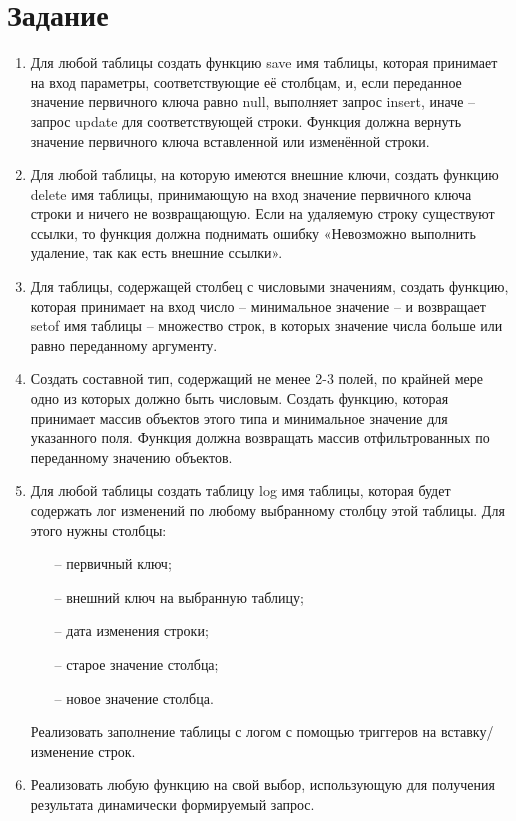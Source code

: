 \documentclass[a4paper,14pt]{extarticle}
\begin{document}
  \section*{Задание}
  \begin{enumerate}
    \item Для любой таблицы создать функцию save имя таблицы, которая принимает на вход параметры, соответствующие её столбцам, и, если переданное значение первичного ключа равно null, выполняет запрос insert, иначе – запрос update для соответствующей строки. Функция должна вернуть значение первичного ключа вставленной или изменённой строки.
    \item Для любой таблицы, на которую имеются внешние ключи, создать функцию delete имя таблицы, принимающую на вход значение первичного ключа строки и ничего не возвращающую. Если на удаляемую строку существуют ссылки, то функция должна поднимать ошибку «Невозможно выполнить удаление, так как есть внешние ссылки».
    \item  Для таблицы, содержащей столбец с числовыми значениям, создать функцию, которая принимает на вход число – минимальное значение – и возвращает setof имя таблицы – множество строк, в которых значение числа больше или равно переданному аргументу. 
    \item Создать составной тип, содержащий не менее 2-3 полей, по крайней мере одно из которых должно быть числовым. Создать функцию, которая принимает массив объектов этого типа и минимальное значение для указанного поля. Функция должна возвращать массив отфильтрованных по переданному значению объектов.
    \item  Для любой таблицы создать таблицу log имя таблицы, которая будет содержать лог изменений по любому выбранному столбцу этой таблицы. Для этого нужны столбцы:
      \begin{itemize}
        \item[--] первичный ключ;
        \item[--] внешний ключ на выбранную таблицу;
        \item[--] дата изменения строки;
        \item[--] старое значение столбца;
        \item[--] новое значение столбца.
      \end{itemize}
      Реализовать заполнение таблицы с логом с помощью триггеров на вставку/изменение строк.
    \item Реализовать любую функцию на свой выбор, использующую для получения результата динамически формируемый запрос.
  \end{enumerate}
\end{document}
